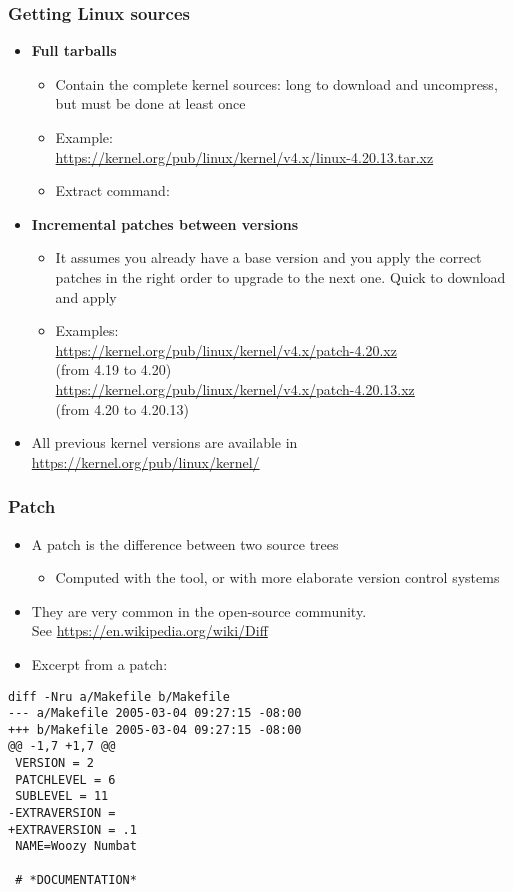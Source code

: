 \begin{frame}
  \frametitle{Getting Linux sources}
  \begin{itemize}
  \item {\bf Full tarballs}
    \begin{itemize}
    \item Contain the complete kernel sources: long to download and
      uncompress, but must be done at least once
    \item Example:\\
      \footnotesize
      \url{https://kernel.org/pub/linux/kernel/v4.x/linux-4.20.13.tar.xz}
      \normalsize
    \item Extract command:\\
      \footnotesize
      \normalsize
    \end{itemize}
  \item {\bf Incremental patches between versions}
    \begin{itemize}
    \item It assumes you already have a base version and you apply the
      correct patches in the right order to upgrade to the next one. Quick to download and apply
    \item Examples:\\
      \scriptsize
      \url{https://kernel.org/pub/linux/kernel/v4.x/patch-4.20.xz}\\(from 4.19 to 4.20)\\
      \url{https://kernel.org/pub/linux/kernel/v4.x/patch-4.20.13.xz}\\(from 4.20 to 4.20.13)
    \end{itemize}
  \item All previous kernel versions are available in
    \url{https://kernel.org/pub/linux/kernel/}
  \end{itemize}
\end{frame}

\begin{frame}[fragile]
  \frametitle{Patch}
  \begin{itemize}
  \item A patch is the difference between two source trees
    \begin{itemize}
    \item Computed with the  tool, or with more elaborate
      version control systems
    \end{itemize}
  \item They are very common in the open-source community.\\
        See \url{https://en.wikipedia.org/wiki/Diff}
  \item Excerpt from a patch:
  \end{itemize}
\footnotesize
\begin{verbatim}
diff -Nru a/Makefile b/Makefile
--- a/Makefile 2005-03-04 09:27:15 -08:00
+++ b/Makefile 2005-03-04 09:27:15 -08:00
@@ -1,7 +1,7 @@
 VERSION = 2
 PATCHLEVEL = 6
 SUBLEVEL = 11
-EXTRAVERSION =
+EXTRAVERSION = .1
 NAME=Woozy Numbat

 # *DOCUMENTATION*
\end{verbatim}
\end{frame}

